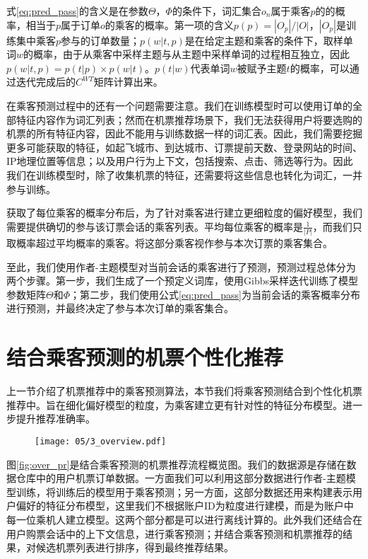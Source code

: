 式\ref{eq:pred_pass}的含义是在参数$\Theta$，$\Phi$的条件下，词汇集合$o_n$属于乘客$p$的的概率，相当于$p$属于订单$o$的乘客的概率。第一项的含义$p(p) = |O_p| / |O|$，$|O_p|$是训练集中乘客$p$参与的订单数量；$p(w|t,p)$是在给定主题和乘客的条件下，取样单词$w$的概率，由于从乘客中采样主题与从主题中采样单词的过程相互独立，因此$p(w|t,p) = p(t|p) \times p(w|t)$。$p(t|w)$代表单词$w$被赋予主题$t$的概率，可以通过迭代完成后的$C^{WT}$矩阵计算出来。

在乘客预测过程中的还有一个问题需要注意。我们在训练模型时可以使用订单的全部特征内容作为词汇列表；然而在机票推荐场景下，我们无法获得用户将要选购的机票的所有特征内容，因此不能用与训练数据一样的词汇表。因此，我们需要挖掘更多可能获取的特征，如起飞城市、到达城市、订票提前天数、登录网站的时间、IP地理位置等信息；以及用户行为上下文，包括搜索、点击、筛选等行为。因此我们在训练模型时，除了收集机票的特征，还需要将这些信息也转化为词汇，一并参与训练。

获取了每位乘客的概率分布后，为了针对乘客进行建立更细粒度的偏好模型，我们需要提供确切的参与该订票会话的乘客列表。平均每位乘客的概率是$\frac{1}{|P|}$，而我们只取概率超过平均概率的乘客。将这部分乘客视作参与本次订票的乘客集合。

至此，我们使用作者-主题模型对当前会话的乘客进行了预测，预测过程总体分为两个步骤。第一步，我们生成了一个预定义词库，使用Gibbs采样迭代训练了模型参数矩阵$\Theta$和$\Phi$；第二步，我们使用公式\ref{eq:pred_pass}为当前会话的乘客概率分布进行预测，并最终决定了参与本次订单的乘客集合。

\section{结合乘客预测的机票个性化推荐}
上一节介绍了机票推荐中的乘客预测算法，本节我们将乘客预测结合到个性化机票推荐中。旨在细化偏好模型的粒度，为乘客建立更有针对性的特征分布模型。进一步提升推荐准确率。

\begin{figure}
 \centering
 \texttt{[image: 05/3\_overview.pdf]}
\end{figure}

图\ref{fig:over_pr}是结合乘客预测的机票推荐流程概览图。我们的数据源是存储在数据仓库中的用户机票订单数据。一方面我们可以利用这部分数据进行作者-主题模型训练，将训练后的模型用于乘客预测；另一方面，这部分数据还用来构建表示用户偏好的特征分布模型，这里我们不根据账户ID为粒度进行建模，而是为账户中每一位乘机人建立模型。这两个部分都是可以进行离线计算的。此外我们还结合在用户购票会话中的上下文信息，进行乘客预测；并结合乘客预测和机票推荐的结果，对候选机票列表进行排序，得到最终推荐结果。

